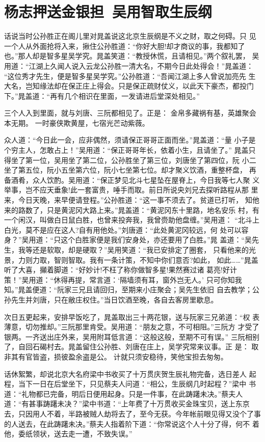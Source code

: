 \chapter{杨志押送金银担~吴用智取生辰纲}

话说当时公孙胜正在阁儿里对晁盖说这北京生辰纲是不义之财，取之何碍。只
见一个人从外面抢将入来，揪住公孙胜道：“你好大胆!却才商议的事，我都知了
也。”那人却是智多星吴学究。晁盖笑道：“教授休慌，且请相见。”两个叙礼罢，
吴用道：“江湖上久闻人说入云龙公孙胜一清大名，不期今日此处得会！”晁盖道：
“这位秀才先生，便是智多星吴学究。”公孙胜道：“吾闻江湖上多人曾说加亮先
生大名，岂知缘法却在保正庄上得会。只是保正疏财仗义，以此天下豪杰，都投门
下。”晁盖道：“再有几个相识在里面，一发请进后堂深处相见。”

三个人入到里面，就与刘唐、三阮都相见了。正是：
金帛多藏祸有基，英雄聚会本无期。
一时豪侠欺黄屋，七宿光芒动紫薇。

众人道：“今日此一会，应非偶然，须请保正哥哥正面而坐。”晁盖道：“量
小子是个穷主人，怎敢占上！”吴用道：“保正哥哥年长，依着小生，且请坐了。”
晁盖只得坐了第一位，吴用坐了第二位，公孙胜坐了第三位，刘唐坐了第四位，阮
小二坐了第五位，阮小五坐第六位，阮小七坐第七位。却才聚义饮酒，重整杯盘，
再备酒肴，众人饮酌。吴用道：“保正梦见北斗七星坠在屋脊上，今日我等七人聚
义举事，岂不应天垂象!此一套富贵，唾手而取。前日所说央刘兄去探听路程从那
里来，今日天晚，来早便请登程。”公孙胜道：“这一事不须去了。贫道已打听，
知他来的路数了，只是黄泥冈大路上来。”晁盖道：“黄泥冈东十里路，地名安乐
村，有一个闲汉，叫做白日鼠白胜，也曾来投奔我，我曾赍助他盘缠。”吴用道：
“北斗上白光，莫不是应在这人?自有用他处。”刘唐道：“此处黄泥冈较远，何
处可以容身？”吴用道：“只这个白胜家便是我们安身处，亦还要用了白胜。”晁
盖道：“吴先生，我等还是软取，却是硬取？”吴用笑道：“我已安排定了圈套，
只看他来的光景，力则力取，智则智取。我有一条计策，不知中你们意否?如此，
如此……”晁盖听了大喜，攧着脚道：“好妙计!不枉了称你做智多星!果然赛过诸
葛亮!好计策！”吴用道：“休得再提，常言道：‘隔墙须有耳，窗外岂无人。’
只可你知我知。”晁盖便道：“阮家三兄且请回归，至期来小庄聚会；吴先生依旧
自去教学；公孙先生并刘唐，只在敝庄权住。”当日饮酒至晚，各自去客房里歇息。

次日五更起来，安排早饭吃了，晁盖取出三十两花银，送与阮家三兄弟道：“权
表薄意，切勿推却。”三阮那里肯受。吴用道：“朋友之意，不可相阻。”三阮方
才受了银两。一齐送出庄外来，吴用附耳低言道：“这般这般，至期不可有误。”
三阮相别了，自回石碣村去。晁盖留住公孙胜、刘唐在庄上，吴学究常来议事。正
是：
取非其有官皆盗，损彼盈余盗是公。
计就只须安稳待，笑他宝担去匆匆。

话休絮繁，却说北京大名府梁中书收买了十万贯庆贺生辰礼物完备，选日差人
起程，当下一日在后堂坐下，只见蔡夫人问道：“相公，生辰纲几时起程？”梁中
书道：“礼物都已完备，明后日便用起身。只是一件事，在此踌躇未决。”蔡夫人
道：“有甚事踌躇未决？”梁中书道：“上年费了十万贯收买金珠宝贝，送上东京
去，只因用人不着，半路被贼人劫将去了，至今无获。今年帐前眼见得又没个了事
的人送去，在此踌躇未决。”蔡夫人指着阶下道：“你常说这个人十分了得，何不
着他，委纸领状，送去走一遭，不致失误。”

